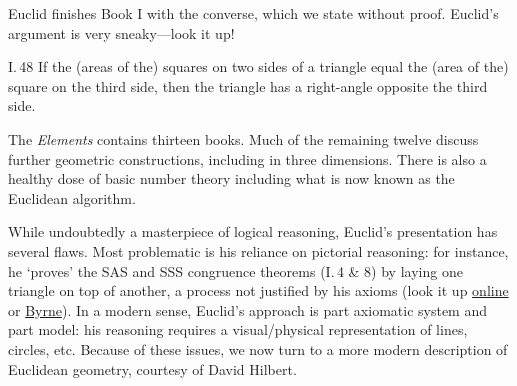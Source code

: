 Euclid finishes Book I with the converse, which we state without proof. Euclid's argument is very sneaky---look it up!

\begin{thm}{I.\,48}{}
	If the (areas of the) squares on two sides of a triangle equal the (area of the) square on the third side, then the  triangle has a right-angle opposite the third side.
\end{thm}

The \emph{Elements} contains thirteen books. Much of the remaining twelve discuss further geometric constructions, including in three dimensions. There is also a healthy dose of basic number theory including what is now known as the Euclidean algorithm.\medbreak

While undoubtedly a masterpiece of logical reasoning, Euclid's presentation has several flaws. Most problematic is his reliance on pictorial reasoning: for instance, he `proves' the SAS and SSS congruence theorems (I.\,4 \& 8) by laying one triangle on top of another, a process not justified by his axioms (look it up \href{http://math.furman.edu/~jpoole/euclidselements/euclid.htm}{online} or \href{http://math.uci.edu/~ndonalds/Elements-I-VI.pdf}{Byrne}). In a modern sense, Euclid's approach is part axiomatic system and part model: his reasoning requires a visual/physical representation of lines, circles, etc. Because of these issues, we now turn to a more modern description of Euclidean geometry, courtesy of David Hilbert.

\clearpage

